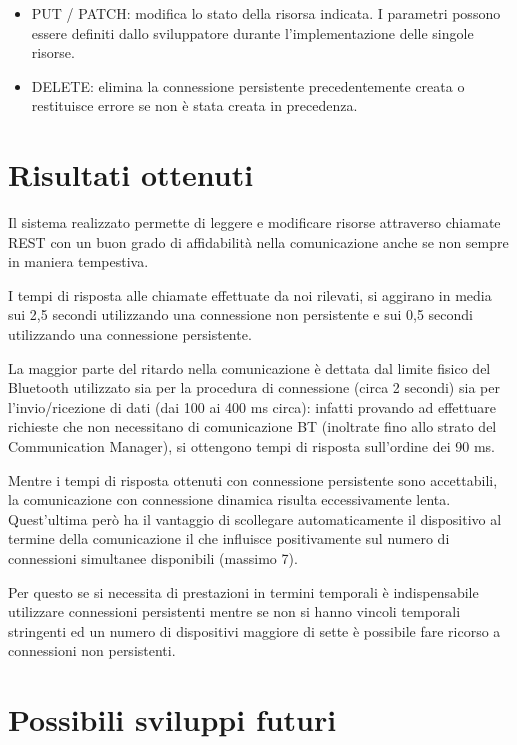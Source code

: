 \documentclass[11pt,a4paper]{article}
\begin{document}
\begin{itemize}
\begin{itemize}
\item PUT / PATCH: modifica lo stato della risorsa indicata. I parametri possono essere definiti dallo sviluppatore durante l'implementazione delle singole risorse.

\item DELETE: elimina la connessione persistente precedentemente creata o restituisce errore se non \`e stata creata in precedenza.

\end{itemize}

\end{itemize}

\section{Risultati ottenuti}

Il sistema realizzato permette di leggere e modificare risorse attraverso chiamate REST con un buon grado di affidabilit\`a nella comunicazione anche se non sempre in maniera tempestiva.

I tempi di risposta alle chiamate effettuate da noi rilevati, si aggirano in media sui 2,5 secondi utilizzando una connessione non persistente e sui 0,5 secondi utilizzando una connessione persistente.

La maggior parte del ritardo nella comunicazione \`e dettata dal limite fisico del Bluetooth utilizzato sia per la procedura di connessione (circa 2 secondi) sia per l'invio/ricezione di dati (dai 100 ai 400 ms circa): infatti provando ad effettuare richieste che non necessitano di comunicazione BT (inoltrate fino allo strato del Communication Manager), si ottengono tempi di risposta sull'ordine dei 90 ms.

Mentre i tempi di risposta ottenuti con connessione persistente sono accettabili, la comunicazione con connessione dinamica risulta eccessivamente lenta.
%
Quest'ultima per\`o ha il vantaggio di scollegare automaticamente il dispositivo al termine della comunicazione il che influisce positivamente sul numero di connessioni simultanee disponibili (massimo 7).

Per questo se si necessita di prestazioni in termini temporali \`e indispensabile utilizzare connessioni persistenti mentre se non si hanno vincoli temporali stringenti ed un numero di dispositivi maggiore di sette \`e possibile fare ricorso a connessioni non persistenti.

\section{Possibili sviluppi futuri}
\end{document}
